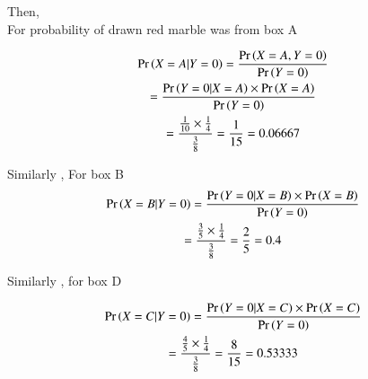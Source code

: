 \documentclass[journal,12pt,twocolumn]{IEEEtran}
\begin{document}
Then,
\\For probability of drawn red marble was from box A


\begin{multline}
    \Pr\left(X=A|Y=0\right)=\frac{\Pr\left(X=A,Y=0\right)}{\Pr\left(Y=0\right)}
    \\ =\frac{\Pr\left(Y=0|X=A\right)\times \Pr\left(X=A\right)}{\Pr\left(Y=0\right)}
    \\ =\frac{\frac{1}{10} \times \frac{1}{4}}{\frac{3}{8}}
    =\frac{1}{15}=0.06667
\end{multline}

Similarly , For box B
\begin{multline}
    \Pr\left(X=B|Y=0\right)=\frac{\Pr\left(Y=0|X=B\right)\times \Pr\left(X=B\right)}{\Pr\left(Y=0\right)}
    \\ =\frac{\frac{3}{5} \times \frac{1}{4}}{\frac{3}{8}}
    =\frac{2}{5} 
    =0.4
\end{multline}

Similarly , for box D

\begin{multline}
    \Pr\left(X=C|Y=0\right)=\frac{\Pr\left(Y=0|X=C\right)\times \Pr\left(X=C\right)}{\Pr\left(Y=0\right)}
    \\ =\frac{\frac{4}{5} \times \frac{1}{4}}{\frac{3}{8}}
    =\frac{8}{15} 
    =0.53333
\end{multline}
\end{document}
